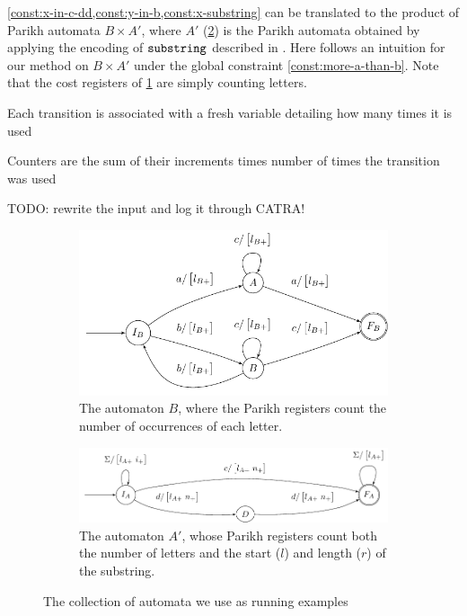 \cref{const:x-in-c-dd,const:y-in-b,const:x-substring} can be translated to the product of Parikh automata $B \times A'$, where $A'$ (\cref{fig:aut_a}) is the Parikh automata obtained by applying the encoding of $\operatorname{\mathtt{substring}}$ described in \cite{ostrich-plus}. Here follows an intuition for our method on $B \times A'$ under the global constraint \cref{const:more-a-than-b}. Note that the cost registers of \cref{fig:aut_b} are simply counting letters.

Each transition is associated with a fresh variable detailing how many times it is used

Counters are the sum of their increments times number of times the transition was used

TODO: rewrite the input and log it through CATRA!

\begin{figure}[h]
    \centering 
\begin{subfigure}[b]{0.49\textwidth}
    \centering
    \includegraphics[scale=\autscale]{b}
    \caption{The automaton $B$, where the Parikh registers count the number of occurrences of each letter.}\label{fig:aut_b}
  \end{subfigure}

  \begin{subfigure}[b]{0.49\textwidth}
    \centering
    \includegraphics[scale=\autscale]{a}
    \caption{The automaton $A'$, whose Parikh registers count both the number of letters and the start ($l$) and length ($r$) of the substring.}\label{fig:aut_a}
  \end{subfigure}
  \caption{The collection of automata we use as running examples}\label{fig:examples}
\end{figure}